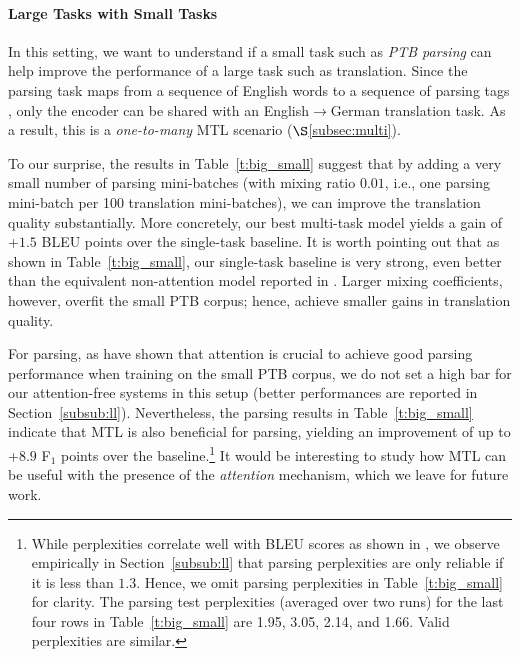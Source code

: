 \paragraph{Large Tasks with Small Tasks} %
In this setting, we want to understand if a small task such as {\it
PTB parsing} can help improve the performance of a large task such as
translation.  Since the parsing task maps from a sequence of English
words to a sequence of parsing tags \citep{vinyals15grammar}, only the
encoder can be shared with an English$\rightarrow$German translation
task.  As a result, this is a {\it one-to-many}
MTL scenario ($\S$\ref{subsec:multi}).

To our surprise, the results in Table~\ref{t:big_small} suggest that
by adding a very small number of parsing mini-batches (with mixing ratio $0.01$,
i.e., one parsing mini-batch per 100 translation mini-batches), we can improve
the translation quality substantially. More concretely,
our best multi-task model yields a gain of +$1.5$ BLEU points over the
single-task baseline. It is worth pointing out that as shown in
Table~\ref{t:big_small}, our single-task baseline is very strong, even better
than the equivalent non-attention model reported in \citep{luong15attn}. Larger
mixing coefficients, however, overfit the small
PTB corpus; hence, achieve smaller gains in translation quality. 

For parsing, as \citet{vinyals15grammar} have shown that attention is crucial to
achieve good parsing performance when training on the small PTB corpus,
we do not set a high bar for our attention-free systems in this setup (better
performances are reported in Section~\ref{subsub:ll}). Nevertheless, the parsing
results in Table~\ref{t:big_small} indicate that MTL is
also beneficial for parsing, yielding an improvement of up to +$8.9$ F$_1$ points
over the baseline.\footnote{While perplexities correlate well with BLEU scores as shown
in \citep{luong15}, we observe empirically in Section~\ref{subsub:ll} that parsing perplexities are only
reliable if it is less than $1.3$. Hence, we omit parsing perplexities in
Table~\ref{t:big_small} for
clarity. The parsing test perplexities (averaged over two
runs) for the last four rows in Table~\ref{t:big_small} are 1.95, 3.05, 2.14, and 1.66. Valid perplexities
are similar.} 
It would be interesting to study how MTL can be
useful with the presence of the {\it attention} mechanism, which we
leave for future work.


